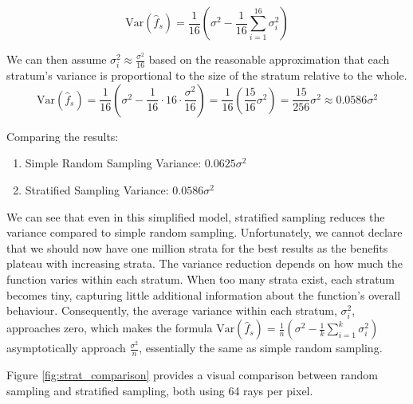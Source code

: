 \documentclass[12pt]{article}
\begin{document}
\[
    \text{Var}(\hat{f}_s) = \frac{1}{16} \left( \sigma^2 - \frac{1}{16} \sum_{i=1}^{16} \sigma_i^2 \right)
\]

We can then assume $\sigma_i^2 \approx \frac{\sigma^2}{16}$ based on the reasonable approximation that each stratum's variance is proportional to the size of the stratum relative to the whole.
\[
    \text{Var}(\hat{f}_s)
    = \frac{1}{16} \left( \sigma^2 - \frac{1}{16} \cdot 16 \cdot \frac{\sigma^2}{16} \right)
    = \frac{1}{16} \left( \frac{15}{16} \sigma^2 \right)
    = \frac{15}{256}\sigma^2 \approx 0.0586\sigma^2
\]

Comparing the results:
\begin{enumerate}
    \item[] Simple Random Sampling Variance: $0.0625\sigma^2$
    \item[] Stratified Sampling Variance: $0.0586\sigma^2$
\end{enumerate}

We can see that even in this simplified model, stratified sampling reduces the variance compared to simple random sampling. Unfortunately, we cannot declare that we should now have one million strata for the best results as the benefits plateau with increasing strata. The variance reduction depends on how much the function varies within each stratum. When too many strata exist, each stratum becomes tiny, capturing little additional information about the function's overall behaviour. Consequently, the average variance within each stratum, $\sigma_i^2$, approaches zero, which makes the formula $\text{Var}(\hat{f}_s) = \frac{1}{n} \left( \sigma^2 - \frac{1}{k} \sum_{i=1}^k \sigma_i^2 \right)$ asymptotically approach $\frac{\sigma^2}{n}$, essentially the same as simple random sampling.

Figure \ref{fig:strat_comparison} provides a visual comparison between random sampling and stratified sampling, both using 64 rays per pixel.
\end{document}
